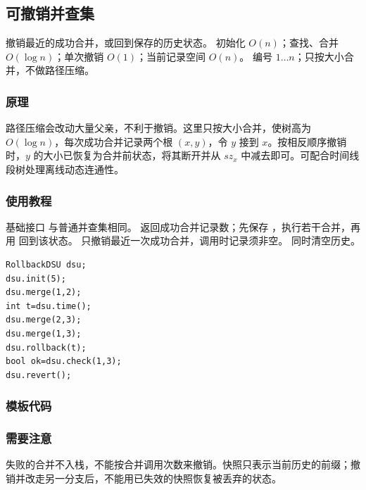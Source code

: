 \subsection{可撤销并查集}
\label{ds:rollback-dsu}
\AlgorithmInfo
    {撤销最近的成功合并，或回到保存的历史状态。}
    {初始化 $O(n)$；查找、合并 $O(\log n)$；单次撤销 $O(1)$；当前记录空间 $O(n)$。}
    {编号 $1\ldots n$；只按大小合并，不做路径压缩。}
\subsubsection*{原理}
路径压缩会改动大量父亲，不利于撤销。这里只按大小合并，使树高为 $O(\log n)$，每次成功合并记录两个根 $(x,y)$，令 $y$ 接到 $x$。按相反顺序撤销时，$y$ 的大小已恢复为合并前状态，将其断开并从 $sz_x$ 中减去即可。可配合时间线段树处理离线动态连通性。

\subsubsection*{使用教程}
基础接口  与普通并查集相同。 返回成功合并记录数；先保存 ，执行若干合并，再用  回到该状态。 只撤销最近一次成功合并，调用时记录须非空。 同时清空历史。
\begin{lstlisting}[style=mtycpp,numbers=none]
RollbackDSU dsu;
dsu.init(5);
dsu.merge(1,2);
int t=dsu.time();
dsu.merge(2,3);
dsu.merge(1,3);
dsu.rollback(t);
bool ok=dsu.check(1,3);
dsu.revert();
\end{lstlisting}
\subsubsection*{模板代码}
\subsubsection*{需要注意}
失败的合并不入栈，不能按合并调用次数来撤销。快照只表示当前历史的前缀；撤销并改走另一分支后，不能用已失效的快照恢复被丢弃的状态。
